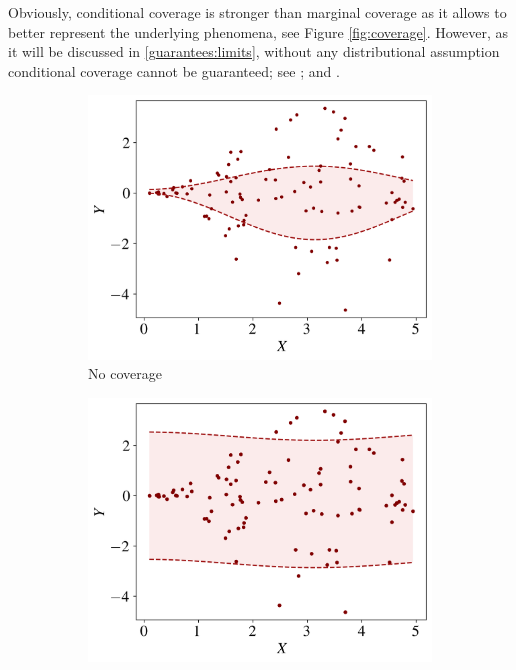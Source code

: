Obviously, conditional coverage is stronger than marginal coverage as it allows to better represent the underlying phenomena, see Figure \ref{fig:coverage}. However, as it will be discussed in \ref{guarantees:limits}, without any distributional assumption conditional coverage cannot be guaranteed; see \cite{lei2014}; \cite{vovk2012} and \cite{barber2021a}.

\begin{figure}[ht]
    \centering
    \begin{subfigure}[b]{0.3\textwidth}
        \centering
        \includegraphics[width=\textwidth]{Figures/coverage/no-coverage.png}
        \caption{No coverage}
        \label{fig:coverage:no-cover}
    \end{subfigure}
    \hfill
    \begin{subfigure}[b]{0.3\textwidth}
        \centering
        \includegraphics[width=\textwidth]{Figures/coverage/marginal-coverage.png}

\end{subfigure}
\end{figure}
